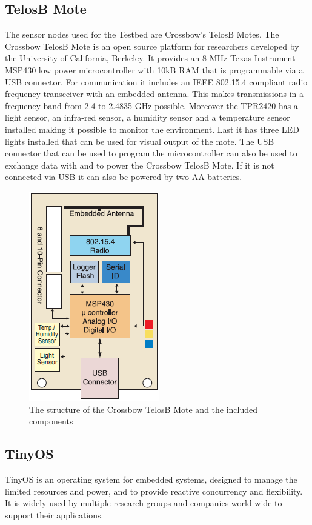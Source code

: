 \subsection{TelosB Mote}
\label{chp:TelosB}
The sensor nodes used for the Testbed are Crossbow's TelosB Motes. The Crossbow TelosB Mote is an open source platform for researchers developed by the University of California, Berkeley. It provides an 8 MHz Texas Instrument MSP430 low power microcontroller with 10kB RAM that is programmable via a USB connector. For communication it includes an IEEE 802.15.4 compliant radio frequency transceiver with an embedded antenna. This makes transmissions in a frequency band from 2.4 to 2.4835 GHz possible. Moreover the TPR2420 has a light sensor, an infra-red sensor, a humidity sensor and a temperature sensor installed making it possible to monitor the environment. Last it has three LED lights installed that can be used for visual output of the mote. The USB connector that can be used to program the microcontroller can also be used to exchange data with and to power the Crossbow TelosB Mote. If it is not connected via USB it can also be powered by two AA batteries. \cite{Telosb}

\begin{figure}[htbp]
	\centering
    \includegraphics[scale=0.7]{content/images/Mote1}
   	\caption{The structure of the Crossbow TelosB Mote and the included components \cite{Telosb}}
    \label{fig:telosb}
\end{figure}
 
\subsection{TinyOS}
TinyOS is an operating system for embedded systems, designed to manage the limited resources and power, and to provide reactive concurrency and flexibility. It is widely used by multiple research groups and companies world wide to support their applications.

